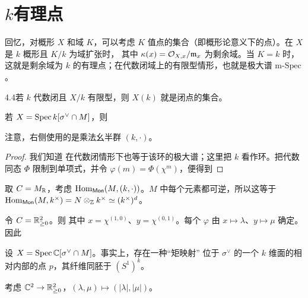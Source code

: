 \section{\texorpdfstring{$k$}{k}有理点}
回忆，对概形 $X$ 和域 $K$，可以考虑 $K$ 值点的集合（即概形论意义下的点）。在 $X$ 是 $k$ 概形且 $K/k$ 为域扩张时，
其中 $\kappa(x)=\mathcal O_{X,x}/\mathfrak m_x$ 为剩余域。当 $K=k$ 时，这就是剩余域为 $k$ 的有理点；在代数闭域上的有限型情形，也就是极大谱 $\mathrm{m\text{-}Spec}$。
\begin{Note}{4.4}若 $k$ 代数闭且 $X/k$ 有限型，则 $X(k)$ 就是闭点的集合。\end{Note}
\begin{proposition}\label{prop:4.4}
若 $X=\operatorname{Spec} k[\sigma^\vee\cap M]$，则
\end{proposition}
注意，右侧使用的是乘法幺半群 $(k,\cdot)$。
\begin{proof}
我们知道
在代数闭情形下也等于该环的极大谱；这里把 $k$ 看作环。把代数同态 $\Phi$ 限制到单项式，并令 $\varphi(m)=\Phi(\chi^m)$，便得到
\end{proof}
\begin{example}\label{ex:4.4}
取 $C=M_{\mathbb R}$，考虑 $\operatorname{Hom}_{\mathsf{Mon}}(M,(k,\cdot))$。$M$ 中每个元素都可逆，所以这等于 $\operatorname{Hom}_{\mathsf{Mon}}(M,k^\times)=N\otimes_{\mathbb Z} k^\times\simeq(k^\times)^d$。
\end{example}
\begin{example}\label{ex:4.5}
令 $C=\mathbb R_{\ge0}^2$。则
其中 $x=\chi^{(1,0)}$、$y=\chi^{(0,1)}$。每个 $\varphi$ 由 $x\mapsto\lambda$、$y\mapsto\mu$ 确定。因此
\end{example}
设 $X=\operatorname{Spec}\mathbb C[\sigma^\vee\cap M]$。事实上，存在一种“矩映射”
位于 $\sigma^\vee$ 的一个 $k$ 维面的相对内部的点 $p$，其纤维同胚于 $(S^1)^k$。
\begin{example}\label{ex:4.6}
考虑 $\mathbb C^2\to\mathbb R_{\ge0}^2$，$(\lambda,\mu)\mapsto(|\lambda|,|\mu|)$。
\end{example}
